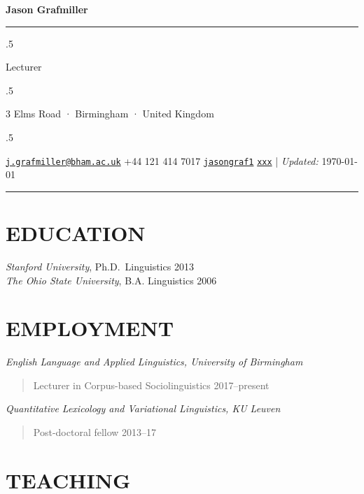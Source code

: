 \documentclass[11pt,]{article}
\begin{document}
\centerline{\huge \bf Jason Grafmiller}

\vspace{2 mm}

\hrule

\vspace{2 mm}

\moveleft.5\hoffset\centerline{Lecturer}
\moveleft.5\hoffset\centerline{3 Elms Road · Birmingham · United Kingdom}
\moveleft.5\hoffset\centerline{ \faEnvelopeO \hspace{1 mm} \href{mailto:}{\tt \href{mailto:j.grafmiller@bham.ac.uk}{\nolinkurl{j.grafmiller@bham.ac.uk}}} \hspace{1 mm}  \faPhone \hspace{1 mm}  +44 121 414 7017  \hspace{1 mm}  \faGithub \hspace{1 mm} \href{http://github.com/jasongraf1}{\tt jasongraf1} \hspace{1 mm}    \faGlobe \hspace{1 mm} \href{http://xxx}{\tt xxx}    | \emph{Updated:} \today}

\vspace{2 mm}

\hrule


\section{EDUCATION}\label{education}

\emph{Stanford University}, Ph.D.~Linguistics \hfill 2013\\
\emph{The Ohio State University}, B.A. Linguistics \hfill 2006

\section{EMPLOYMENT}\label{employment}

\emph{English Language and Applied Linguistics, University of
Birmingham}

\begin{quote}
Lecturer in Corpus-based Sociolinguistics \hfill 2017--present
\end{quote}

\emph{Quantitative Lexicology and Variational Linguistics, KU Leuven}

\begin{quote}
Post-doctoral fellow \hfill 2013--17
\end{quote}

\section{TEACHING}\label{teaching}
\end{document}
